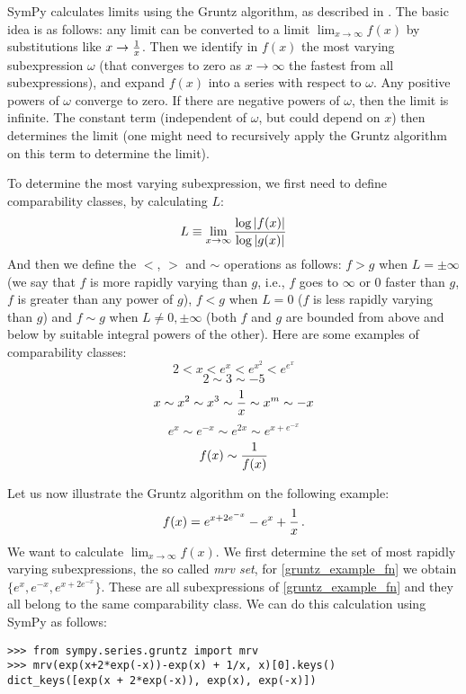 SymPy calculates limits using the Gruntz algorithm, as described in
\cite{Gruntz1996limits}. The basic idea is as follows: any limit can be
converted to a limit $\lim_{x\to\infty} f(x)$ by substitutions like
$x\to{1\over x}$.
Then we identify in $f(x)$ the most varying subexpression $\omega$ (that
converges to zero as $x\to\infty$ the fastest from all subexpressions), and
expand $f(x)$ into a series with respect to $\omega$. Any positive powers of
$\omega$ converge to zero. If there are negative powers of $\omega$, then the
limit is infinite. The constant term (independent of $\omega$, but could depend
on $x$) then determines the limit (one might need to recursively apply the
Gruntz algorithm on this term to determine the limit).

To determine the most varying subexpression, we first need to define
comparability classes, by calculating $L$:
\begin{equation}
L\equiv \lim_{x\to\infty} {\log |f(x)| \over \log |g(x)|}
\end{equation}
And then we define the $<$, $>$ and $\sim$ operations as follows: $f>g$ when
$L=\pm\infty$ (we say that $f$ is more rapidly varying than $g$, i.e., $f$ goes
to $\infty$ or $0$ faster than $g$, $f$ is greater than any power of $g$),
$f<g$ when $L=0$ ($f$ is less rapidly varying than $g$) and $f\sim g$ when
$L\neq 0,\pm\infty$ (both $f$ and $g$ are bounded from above and below by
suitable integral powers of the other). Here are some examples of comparability
classes:
$$2 < x < e^x < e^{x^2} < e^{e^x}$$
$$2\sim 3\sim -5$$
$$x\sim x^2\sim x^3\sim {1\over x}\sim x^m\sim -x$$
$$e^x\sim e^{-x}\sim e^{2x}\sim e^{x+e^{-x}}$$
$$f(x)\sim{1\over f(x)}$$

Let us now illustrate the Gruntz algorithm on the following example:
\begin{equation}
    \label{gruntz_example_fn}
f(x) = e^{x+2e^{-x}} - e^x + {1\over x} \,.
\end{equation}
We want to calculate $\lim_{x\to\infty} f(x)$.
We first determine the set of most rapidly varying subexpressions, the so
called \textit{mrv set}, for \eqref{gruntz_example_fn} we obtain
$\{e^x, e^{-x}, e^{x+2e^{-x}}\}$. These are all subexpressions of
\eqref{gruntz_example_fn} and they all belong to the same comparability class.
We can do this calculation using SymPy as follows:

\begin{verbatim}
>>> from sympy.series.gruntz import mrv
>>> mrv(exp(x+2*exp(-x))-exp(x) + 1/x, x)[0].keys()
dict_keys([exp(x + 2*exp(-x)), exp(x), exp(-x)])
\end{verbatim}



